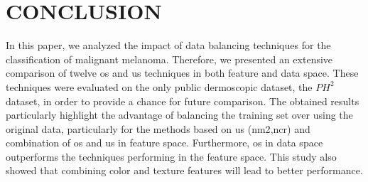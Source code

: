 \graphicspath{ {./content/Experiments-results/figures/} }

\section{\uppercase{Conclusion}}
\label{sec:cons} 

\noindent In this paper, we analyzed the impact of data balancing techniques for the classification of malignant melanoma. 
Therefore, we presented an extensive comparison of twelve \ac{os} and \ac{us} techniques in both feature and data space. 
These techniques were evaluated on the only public dermoscopic dataset, the $PH^{2}$ dataset, in order to provide a chance for future comparison.
The obtained results particularly highlight the advantage of balancing the training set over using the original data, particularly for the methods based on \ac{us} (\ac{nm2},\ac{ncr}) and combination of \ac{os} and \ac{us} in feature space.
Furthermore, \ac{os} in data space outperforms the techniques performing in the feature space.
This study also showed that combining color and texture features will lead to better performance. 



